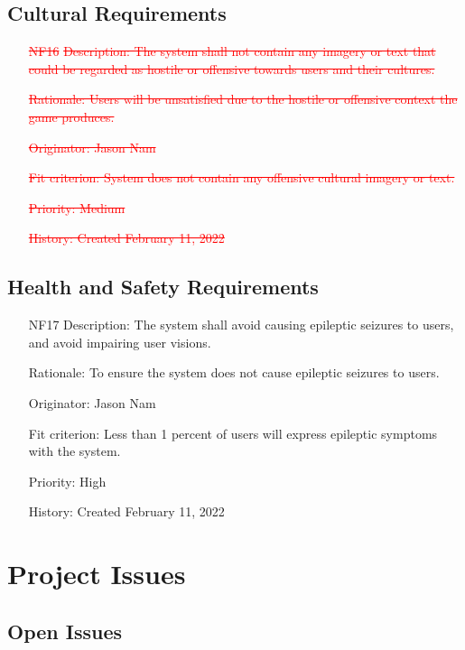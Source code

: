 \documentclass[12pt, titlepage]{article}
\begin{document}
\subsection{Cultural Requirements}

\begin{itemize}
    \item[\textcolor{red}{\st{NF16}}]
\textcolor{red}{\st{Description: The system shall not contain any imagery or text that could be regarded as hostile or offensive towards users and their cultures.}}

\textcolor{red}{\st{Rationale: Users will be unsatisfied due to the hostile or offensive context the game produces.}}

\textcolor{red}{\st{Originator: Jason Nam}}

\textcolor{red}{\st{Fit criterion: System does not contain any offensive cultural imagery or text.}}

\textcolor{red}{\st{Priority: Medium}}

\textcolor{red}{\st{History: Created February 11, 2022}}

\end{itemize}

\subsection{Health and Safety Requirements}

\begin{itemize}
    \item[NF17]
Description: The system shall avoid causing epileptic seizures to users, and avoid impairing user visions.

Rationale: To ensure the system does not cause epileptic seizures to users.

Originator: Jason Nam

Fit criterion: Less than 1 percent of users will express epileptic symptoms with the system.

Priority: High

History: Created February 11, 2022

\end{itemize}

\section{Project Issues}

\subsection{Open Issues}
\end{document}
